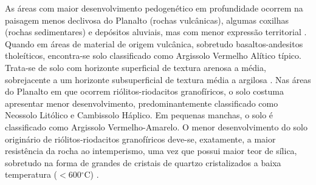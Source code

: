 \documentclass[final]{article}
\begin{document}

As áreas com maior desenvolvimento pedogenético em profundidade ocorrem na paisagem menos declivosa do Planalto (rochas vulcânicas), algumas coxilhas (rochas sedimentares) e depósitos aluviais, mas com menor expressão territorial \cite{Miguel2010}. Quando em áreas de material de origem vulcânica, sobretudo basaltos-andesitos tholeíticos, encontra-se solo classificado como Argissolo Vermelho Alítico típico. Trata-se de solo com horizonte superficial de textura arenosa a média, sobrejacente a um horizonte subsuperficial de textura média a argilosa \cite{Miguel2010}. Nas áreas do Planalto em que ocorrem riólitos-riodacitos granofíricos, o solo costuma apresentar menor desenvolvimento, predominantemente classificado como Neossolo Litólico e Cambissolo Háplico. Em pequenas manchas, o solo é classificado como Argissolo Vermelho-Amarelo. O menor desenvolvimento do solo originário de riólitos-riodacitos granofíricos deve-se, exatamente, a maior resistência da rocha ao intemperismo, uma vez que possui maior teor de sílica, sobretudo na forma de grandes de cristais de quartzo cristalizados a baixa temperatura ($<$600$^\circ$C) \cite{Pedron2007}.
\end{document}
